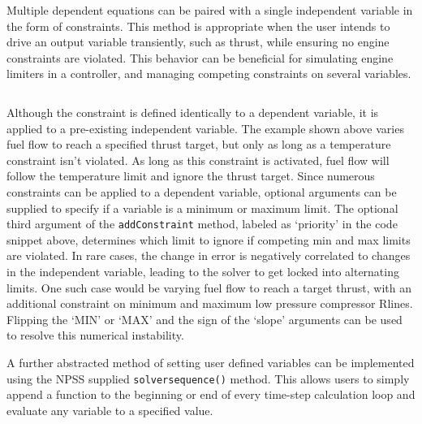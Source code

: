 \documentclass[heading.tex]{subfiles}
\begin{document}
 \begin{adjustwidth}{1cm}{-1cm}
 \inputminted[]{c++}{code/solverSetup}
 \end{adjustwidth} 


Multiple dependent equations can be paired with a single independent variable in the form of constraints.
This method is appropriate when the user intends to drive an output variable transiently,
such as thrust, while ensuring no engine constraints are violated.
This behavior can be beneficial for simulating engine limiters in a controller, and managing 
competing constraints on several variables.
 
 \begin{adjustwidth}{1cm}{-1cm}
 \inputminted[]{c++}{code/constraintSetup}
 \end{adjustwidth} 
 
Although the constraint is defined identically to a dependent variable, it is applied to a pre-existing independent variable.
The example shown above varies fuel flow to reach a specified thrust target, but only as long as a temperature constraint isn't violated.
As long as this constraint is activated, fuel flow will follow the temperature limit and ignore the thrust target.
Since numerous constraints can be applied to a dependent variable,
optional arguments can be supplied to specify if a variable is a minimum or maximum limit.
The optional third argument of the \texttt{addConstraint} method, labeled as `priority' in the code snippet above,
determines which limit to ignore if competing min and max limits are violated.
In rare cases, the change in error is negatively correlated to changes in the independent variable,
leading to the solver to get locked into alternating limits. One such case would be varying fuel flow to reach a target thrust,
with an additional constraint on minimum and maximum low pressure compressor Rlines.
Flipping the `MIN' or `MAX' and the sign of the `slope' arguments can be used to resolve this numerical instability.

A further abstracted method of setting user defined variables can be implemented using the NPSS supplied 
\texttt{solversequence()} method.
This allows users to simply append a function to the beginning or end of every time-step calculation loop
and evaluate any variable to a specified value. 
 
 \begin{adjustwidth}{-1cm}{-1cm}
 \inputminted[]{c++}{code/solverSequence}
 \end{adjustwidth} 
 
\end{document}

